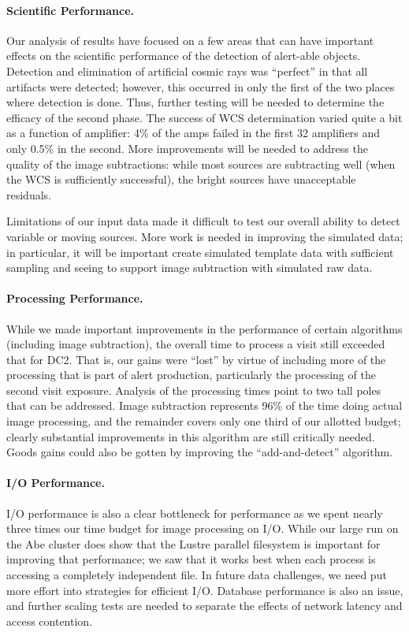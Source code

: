 \paragraph{Scientific Performance.}  Our analysis of results have
focused on a few areas that can have important effects on the scientific
performance of the detection of alert-able objects.  Detection and
elimination of artificial cosmic rays was ``perfect'' in that all
artifacts were detected; however, this occurred in only the first of
the two places where detection is done.  Thus, further testing will be
needed to determine the efficacy of the second phase.  The success of
WCS determination varied quite a bit as a function of amplifier: 4\%
of the amps failed in the first 32 amplifiers and only 0.5\% in the
second.  More improvements will be needed to address the quality of
the image
subtractions:  while most sources are subtracting well (when the WCS is
sufficiently successful),  the bright sources have unacceptable residuals.

Limitations of our input data made it difficult to test our overall
ability to detect variable or moving sources.  More work is needed in
improving the simulated data; in particular, it will be important
create simulated template data with sufficient sampling and seeing to
support image subtraction with simulated raw data.  

\paragraph{Processing Performance.}  While we made important
improvements in the performance of certain algorithms (including image
subtraction), the overall time to process a visit still exceeded that
for DC2.  That is, our gains were ``lost'' by virtue of
including more of the processing that is part of alert production,
particularly the processing of the second visit exposure.  Analysis of
the processing times point to two tall poles that can be addressed.
Image subtraction represents 96\% of the time doing actual image
processing, and the remainder covers only one third of our allotted
budget; clearly substantial improvements in this algorithm are still
critically needed.  Goods gains could also be gotten by improving the
``add-and-detect'' algorithm.  

\paragraph{I/O Performance.}  I/O performance is also a clear
bottleneck for performance as we spent nearly three times our time
budget for image processing on I/O.  While our large run on the Abe
cluster does show that the Lustre parallel filesystem is important
for improving that performance; we saw that it works best when each
process is accessing a completely independent file.  In future data
challenges, we need put more effort into strategies for efficient I/O.
Database performance is also an issue, and further scaling tests are
needed to separate the effects of network latency and access
contention.  

